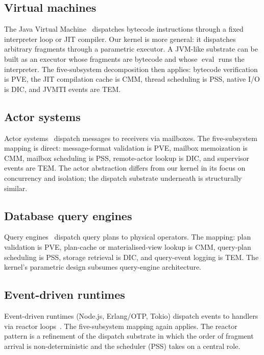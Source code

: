 \documentclass[twocolumn,11pt,a4paper]{article}
\DeclareMathOperator{\eval}{eval}
\begin{document}
\subsection{Virtual machines}

The Java Virtual Machine~\citep{lindholm2014jvm} dispatches bytecode instructions through a fixed interpreter loop or JIT compiler. Our kernel is more general: it dispatches arbitrary fragments through a parametric executor. A JVM-like substrate can be built as an executor whose fragments are bytecode and whose $\eval$ runs the interpreter. The five-subsystem decomposition then applies: bytecode verification is PVE, the JIT compilation cache is CMM, thread scheduling is PSS, native I/O is DIC, and JVMTI events are TEM.

\subsection{Actor systems}

Actor systems~\citep{hewitt1973actor,agha1986actors,armstrong2003erlang} dispatch messages to receivers via mailboxes. The five-subsystem mapping is direct: message-format validation is PVE, mailbox memoization is CMM, mailbox scheduling is PSS, remote-actor lookup is DIC, and supervisor events are TEM. The actor abstraction differs from our kernel in its focus on concurrency and isolation; the dispatch substrate underneath is structurally similar.

\subsection{Database query engines}

Query engines~\citep{graefe1993query} dispatch query plans to physical operators. The mapping: plan validation is PVE, plan-cache or materialised-view lookup is CMM, query-plan scheduling is PSS, storage retrieval is DIC, and query-event logging is TEM. The kernel's parametric design subsumes query-engine architecture.

\subsection{Event-driven runtimes}

Event-driven runtimes (Node.js, Erlang/OTP, Tokio) dispatch events to handlers via reactor loops~\citep{schmidt2000pattern}. The five-subsystem mapping again applies. The reactor pattern is a refinement of the dispatch substrate in which the order of fragment arrival is non-deterministic and the scheduler (PSS) takes on a central role.
\end{document}
